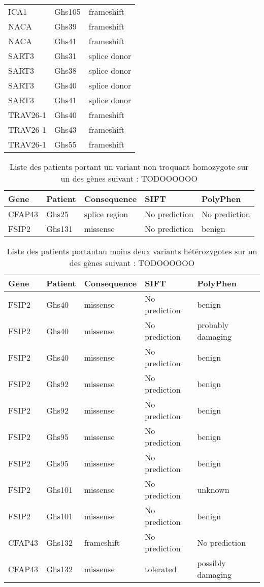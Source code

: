 \documentclass[12pt,twoside]{reedthesis}
\theoremstyle{definition}
\theoremstyle{definition}
\theoremstyle{remark}
\begin{document}
\begin{longtable}[t]{lll}
  ICA1 & Ghs105 & frameshift\\
  \addlinespace
  NACA & Ghs39 & frameshift\\
  NACA & Ghs41 & frameshift\\
  SART3 & Ghs31 & splice donor\\
  SART3 & Ghs38 & splice donor\\
  SART3 & Ghs40 & splice donor\\
  \addlinespace
  SART3 & Ghs41 & splice donor\\
  TRAV26-1 & Ghs40 & frameshift\\
  TRAV26-1 & Ghs43 & frameshift\\
  TRAV26-1 & Ghs55 & frameshift\\
  \bottomrule
  \end{longtable}
  
  \begin{longtable}[t]{lllll}
  \caption{\label{tab:tabgrp2moderate}Liste des patients portant un variant non troquant homozygote sur un des gènes suivant : TODOOOOOO}\\
  \toprule
  Gene & Patient & Consequence & SIFT & PolyPhen\\
  \midrule
  CFAP43 & Ghs25 & splice region & No prediction & No prediction\\
  FSIP2 & Ghs131 & missense & No prediction & benign\\
  \bottomrule
  \end{longtable}
  
  \newpage
  
  \begin{longtable}[t]{lllll}
  \caption{\label{tab:tabgrp2low}Liste des patients portantau moins deux variants hétérozygotes sur un des gènes suivant : TODOOOOOO}\\
  \toprule
  Gene & Patient & Consequence & SIFT & PolyPhen\\
  \midrule
  FSIP2 & Ghs40 & missense & No prediction & benign\\
  FSIP2 & Ghs40 & missense & No prediction & probably damaging\\
  FSIP2 & Ghs40 & missense & No prediction & benign\\
  FSIP2 & Ghs92 & missense & No prediction & benign\\
  FSIP2 & Ghs92 & missense & No prediction & benign\\
  \addlinespace
  FSIP2 & Ghs95 & missense & No prediction & benign\\
  FSIP2 & Ghs95 & missense & No prediction & benign\\
  FSIP2 & Ghs101 & missense & No prediction & unknown\\
  FSIP2 & Ghs101 & missense & No prediction & benign\\
  CFAP43 & Ghs132 & frameshift & No prediction & No prediction\\
  CFAP43 & Ghs132 & missense & tolerated & possibly damaging\\
  \bottomrule
  \end{longtable}
  
\end{document}
